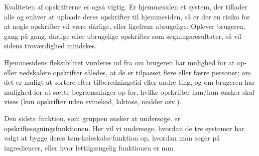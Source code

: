 Kvaliteten af opskrifterne er også vigtig. Er hjemmesiden \fx et system, der tillader alle og enhver at uploade deres opskrifter til hjemmesiden, så er der en risiko for at nogle opskrifter vil være dårlige, eller ligefrem ubrugelige. Oplever brugeren, gang på gang, dårlige eller ubrugelige opskrifter som søgningsresultater, så vil sidens troværdighed mindskes. 

Hjemmesidens fleksibilitet vurderes ud fra om brugeren har mulighed for \fx at op- eller nedskalere opskrifter således, at de er tilpasset flere eller færre personer; om det er muligt at sortere efter tilberedningstid eller andre ting, og om brugeren har mulighed for at sætte begrænsninger op for, hvilke opskrifter han/hun ønsker skal vises (\fx kun opskrifter uden svinekød, laktose, nødder osv.). 

Den sidste funktion, som gruppen ønsker at undersøge, er opskriftssøgningsfunktionen. Her vil vi undersøge, hvordan de tre systemer har valgt at bygge deres tøm-køleskabs-funktion op, \fx hvordan man søger på ingredienser, eller hvor lettilgængelig funktionen er mm.






